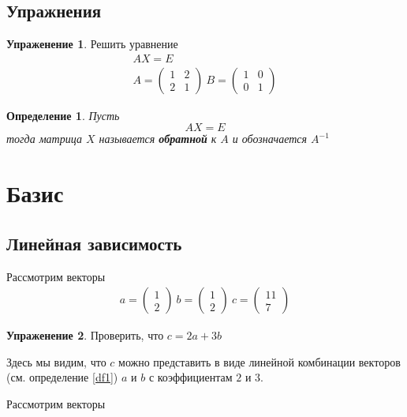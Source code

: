 \documentclass[]{article}
\theoremstyle{theorem}
\newtheorem{dfn}{Определение}
\theoremstyle{definition}
\newtheorem{tk}{Упраженение}
\begin{document}
\subsection{Упражнения}
\begin{tk}
	Решить уравнение
\begin{gather*}
	AX=E
	\\
	A=
	\begin{pmatrix}
		1 & 2
		\\
		2 & 1
	\end{pmatrix}
	\
	B=
	\begin{pmatrix}
		1 & 0
		\\
		0 & 1
	\end{pmatrix}
\end{gather*}
\end{tk}
\begin{dfn}
	Пусть
	\begin{equation}
		AX=E
	\end{equation}
	тогда матрица $X$ называется \textbf{обратной} к $A$ и обозначается $A^{-1}$
\end{dfn}
\section{Базис}
\subsection{Линейная зависимость}
Рассмотрим векторы
\begin{gather}\label{eq2}
	a=
	\begin{pmatrix}
		1
		\\
		2
	\end{pmatrix}
	\
	b=
	\begin{pmatrix}
		1
		\\
		2
	\end{pmatrix}
	\
	c=
	\begin{pmatrix}
		11
		\\
		7
	\end{pmatrix}
\end{gather}

\begin{tk}
	Проверить, что $c=2a+3b$
\end{tk}

Здесь мы видим, что $c$ можно представить в виде линейной комбинации векторов (см. определение \ref{df1}) $a$ и $b$ с коэффициентам $2$ и $3$.

Рассмотрим векторы
\end{document}
